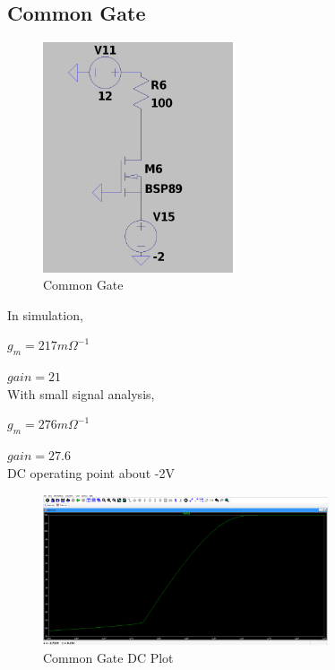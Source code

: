 \documentclass{article}
\begin{document}
\subsection{Common Gate}

\begin{figure}[H]
    \centering
    \includegraphics[width=0.5\textwidth]{CommonGate.jpg}
    \caption{Common Gate}
\end{figure}

In simulation,

$g_m = 217m\Omega^{-1}$

$gain = 21$\\
With small signal analysis,

$g_m = 276m\Omega^{-1}$

$gain = 27.6$\\
DC operating point about -2V

\begin{figure}[H]
    \centering
    \includegraphics[width=0.75\textwidth]{CommonGatePlot.jpg}
    \caption{Common Gate DC Plot}
\end{figure}
\end{document}

